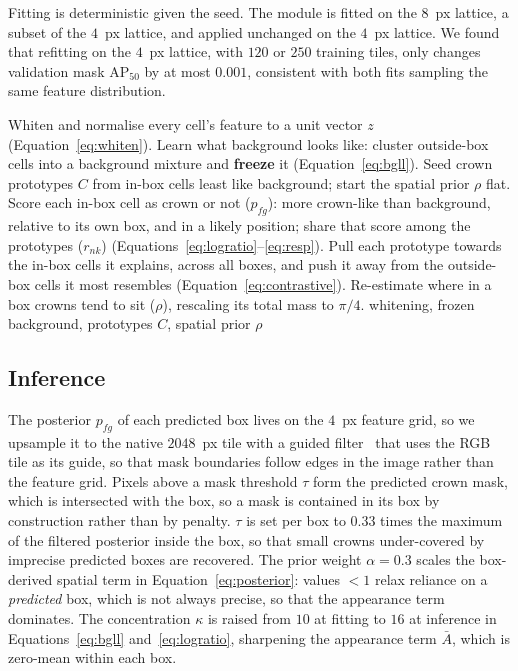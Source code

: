 \documentclass[remotesensing,article,submit,moreauthors]{Definitions/mdpi}
\begin{document}
Fitting is deterministic given the seed. The module is fitted on the $8$~px lattice, a subset of the $4$~px lattice, and applied unchanged on the $4$~px lattice. We found that refitting on the $4$~px lattice, with $120$ or $250$ training tiles, only changes validation mask AP$_{50}$ by at most $0.001$, consistent with both fits sampling the same feature distribution.

\begin{algorithm}[H]
\caption{Box-to-mask fit (once, boxes only; $\kappa = 10$, $\beta = 0.5$, $T = 30$).\label{alg:fit}}
\begin{algorithmic}[1]
\State Whiten and normalise every cell's feature to a unit vector $z$ (Equation~\eqref{eq:whiten}).
\State Learn what background looks like: cluster outside-box cells into a background mixture and \textbf{freeze} it (Equation~\eqref{eq:bgll}).
\State Seed crown prototypes $C$ from in-box cells least like background; start the spatial prior $\rho$ flat.
  \State Score each in-box cell as crown or not ($p_{fg}$): more crown-like than background, relative to its own box, and in a likely position; share that score among the prototypes ($r_{nk}$) (Equations~\eqref{eq:logratio}--\eqref{eq:resp}). 
  \State Pull each prototype towards the in-box cells it explains, across all boxes, and push it away from the outside-box cells it most resembles (Equation~\eqref{eq:contrastive}). 
  \State Re-estimate where in a box crowns tend to sit ($\rho$), rescaling its total mass to $\pi/4$.
\EndFor
\State \Return whitening, frozen background, prototypes $C$, spatial prior $\rho$
\end{algorithmic}
\end{algorithm}


\subsection{Inference}
\label{sec:inference}

The posterior $p_{fg}$ of each predicted box lives on the $4$~px feature grid, so we upsample it to the native $2048$~px tile with a guided filter~\cite{guidedfilter} that uses the RGB tile as its guide, so that mask boundaries follow edges in the image rather than the feature grid. Pixels above a mask threshold $\tau$ form the predicted crown mask, which is intersected with the box, so a mask is contained in its box by construction rather than by penalty. $\tau$ is set per box to $0.33$ times the maximum of the filtered posterior inside the box, so that small crowns under-covered by imprecise predicted boxes are recovered. The prior weight $\alpha = 0.3$ scales the box-derived spatial term in Equation~\eqref{eq:posterior}: values $< 1$ relax reliance on a \emph{predicted} box, which is not always precise, so that the appearance term dominates. The concentration $\kappa$ is raised from $10$ at fitting to $16$ at inference in Equations~\eqref{eq:bgll} and~\eqref{eq:logratio}, sharpening the appearance term $\bar A$, which is zero-mean within each box.
\end{document}
